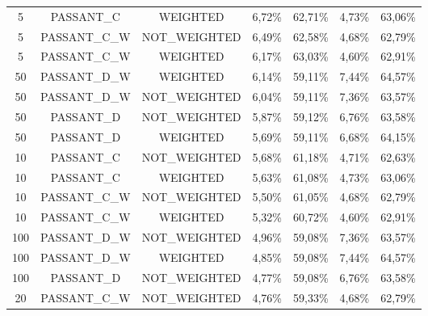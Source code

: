 \begin{table}[H]
{\begin{tabular}{ccccccc}
			5 &  PASSANT\_C &   WEIGHTED &     6,72\% &    62,71\% &     4,73\% &    63,06\% \\
			
			5 & PASSANT\_C\_W & NOT\_WEIGHTED &     6,49\% &    62,58\% &     4,68\% &    62,79\% \\
			
			5 & PASSANT\_C\_W &   WEIGHTED &     6,17\% &    63,03\% &     4,60\% &    62,91\% \\
			
			50 & PASSANT\_D\_W &   WEIGHTED &     6,14\% &    59,11\% &     7,44\% &    64,57\% \\
			
			50 & PASSANT\_D\_W & NOT\_WEIGHTED &     6,04\% &    59,11\% &     7,36\% &    63,57\% \\
			
			50 &  PASSANT\_D & NOT\_WEIGHTED &     5,87\% &    59,12\% &     6,76\% &    63,58\% \\
			
			50 &  PASSANT\_D &   WEIGHTED &     5,69\% &    59,11\% &     6,68\% &    64,15\% \\
			
			10 &  PASSANT\_C & NOT\_WEIGHTED &     5,68\% &    61,18\% &     4,71\% &    62,63\% \\
			
			10 &  PASSANT\_C &   WEIGHTED &     5,63\% &    61,08\% &     4,73\% &    63,06\% \\
			
			10 & PASSANT\_C\_W & NOT\_WEIGHTED &     5,50\% &    61,05\% &     4,68\% &    62,79\% \\
			
			10 & PASSANT\_C\_W &   WEIGHTED &     5,32\% &    60,72\% &     4,60\% &    62,91\% \\
			
			100 & PASSANT\_D\_W & NOT\_WEIGHTED &     4,96\% &    59,08\% &     7,36\% &    63,57\% \\
			
			100 & PASSANT\_D\_W &   WEIGHTED &     4,85\% &    59,08\% &     7,44\% &    64,57\% \\
			
			100 &  PASSANT\_D & NOT\_WEIGHTED &     4,77\% &    59,08\% &     6,76\% &    63,58\% \\
			
			20 & PASSANT\_C\_W & NOT\_WEIGHTED &     4,76\% &    59,33\% &     4,68\% &    62,79\% \\
			

\end{tabular}}
\end{table}

